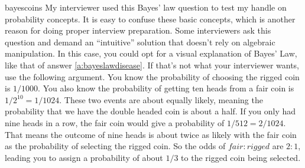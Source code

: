 \begin{answer}{bayescoins}
My interviewer used this Bayes' law question to test my handle on probability concepts.
It is easy to confuse these basic concepts, which is another reason for doing proper interview preparation.
Some interviewers ask this question and demand an ``intuitive'' solution that doesn't rely on algebraic manipulation.
In this case, you could opt for a visual explanation of Bayes' Law, like that of answer \ref{a:bayeslawdisease}.
If that's not what your interviewer wants, use the following argument.
You know the probability of choosing the rigged coin is $1/1000$.
You also know the probability of getting ten heads from a fair coin is $1/2^{10} = 1/1024$.
These two events are about equally likely, meaning the probability that we have the double headed coin is about a half.
If you only had nine heads in a row, the fair coin would give a probability of $1/512 = 2/1024$.
That means the outcome of nine heads is about twice as likely with the fair coin as the probability of selecting the rigged coin.
So the odds of ${fair}{:}{rigged}$ are $2{:}1$, leading you to assign a probability of about $1/3$ to the rigged coin being selected.
\end{answer}

